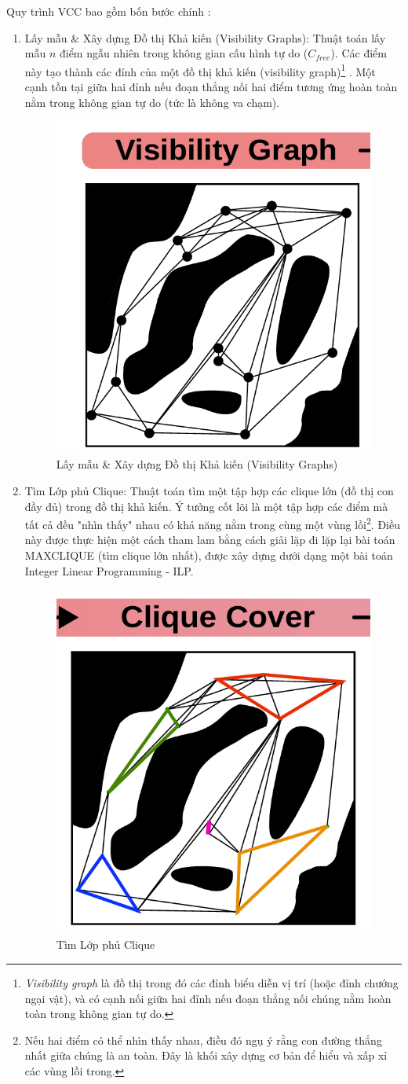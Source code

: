 \documentclass{article}
\begin{document}
Quy trình VCC bao gồm bốn bước chính \cite{vcc2023}:
\begin{enumerate}
\item Lấy mẫu \& Xây dựng Đồ thị Khả kiến (Visibility Graphs): Thuật toán lấy mẫu $n$ điểm ngẫu nhiên trong không gian cấu hình tự do ($C_{free}$). Các điểm này tạo thành các đỉnh của một đồ thị khả kiến (visibility graph)\footnote{\textit{Visibility graph} là đồ thị trong đó các đỉnh biểu diễn vị trí (hoặc đỉnh chướng ngại vật), và có cạnh nối giữa hai đỉnh nếu đoạn thẳng nối chúng nằm hoàn toàn trong không gian tự do.}
. Một cạnh tồn tại giữa hai đỉnh nếu đoạn thẳng nối hai điểm tương ứng hoàn toàn nằm trong không gian tự do (tức là không va chạm).

\begin{figure}[H]
    \centering
    \includegraphics[width=0.5\linewidth]{imgs/VCC-1.png}
    \caption{Lấy mẫu \& Xây dựng Đồ thị Khả kiến (Visibility Graphs)}
\end{figure}

\item Tìm Lớp phủ Clique: Thuật toán tìm một tập hợp các clique lớn (đồ thị con đầy đủ) trong đồ thị khả kiến. Ý tưởng cốt lõi là một tập hợp các điểm mà tất cả đều "nhìn thấy" nhau có khả năng nằm trong cùng một vùng lồi\footnote{Nếu hai điểm có thể nhìn thấy nhau, điều đó ngụ ý rằng con đường thẳng nhất giữa chúng là an toàn. Đây là khối xây dựng cơ bản để hiểu và xấp xỉ các vùng lồi trong.}. Điều này được thực hiện một cách tham lam bằng cách giải lặp đi lặp lại bài toán MAXCLIQUE (tìm clique lớn nhất), được xây dựng dưới dạng một bài toán Integer Linear Programming - ILP.

\begin{figure}[H]
    \centering
    \includegraphics[width=0.5\linewidth]{imgs/VCC-2.png}
    \caption{Tìm Lớp phủ Clique}
\end{figure}


\end{enumerate}
\end{document}

